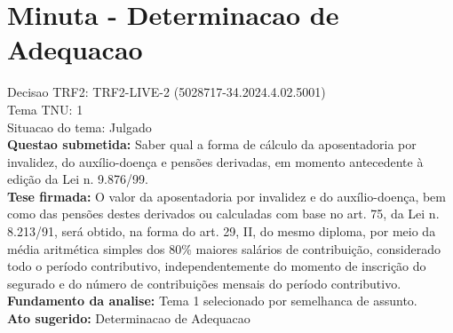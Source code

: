 \documentclass{article}
\begin{document}
\section*{Minuta - Determinacao de Adequacao}
Decisao TRF2: TRF2-LIVE-2 (5028717-34.2024.4.02.5001)\\
Tema TNU: 1\\
Situacao do tema: Julgado\\
\textbf{Questao submetida:} Saber qual a forma de cálculo da aposentadoria por invalidez, do auxílio-doença e pensões derivadas, em momento antecedente à edição da Lei n. 9.876/99.\\
\textbf{Tese firmada:} O valor da aposentadoria por invalidez e do auxílio-doença, bem como das pensões destes derivados ou calculadas com base no art. 75, da Lei n. 8.213/91, será obtido, na forma do art. 29, II, do mesmo diploma, por meio da média aritmética simples dos 80\% maiores salários de contribuição, considerado todo o período contributivo, independentemente do momento de inscrição do segurado e do número de contribuições mensais do período contributivo.\\
\textbf{Fundamento da analise:} Tema 1 selecionado por semelhanca de assunto.\\
\textbf{Ato sugerido:} Determinacao de Adequacao
\end{document}
